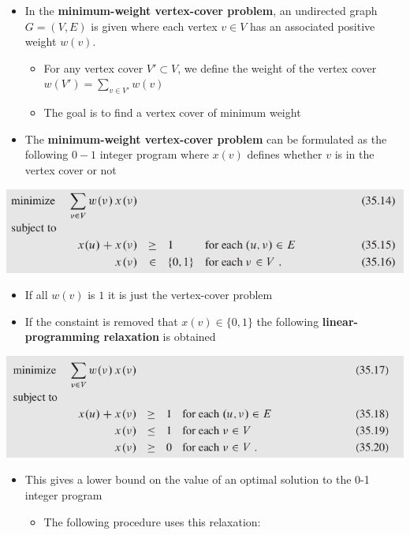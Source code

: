 \documentclass[11pt]{article}
\begin{document}
\begin{itemize}
\item In the \textbf{minimum-weight vertex-cover problem}, an undirected graph \(G=(V,E)\) is given where each vertex \(v \in V\) has an associated positive weight \(w(v)\).
\begin{itemize}
\item For any vertex cover \(V' \subset V\), we define the weight of the vertex cover \(w(V') = \sum_{v \in V'} w(v)\)
\item The goal is to find a vertex cover of minimum weight
\end{itemize}

\item The \textbf{minimum-weight vertex-cover problem} can be formulated as the following \(0-1\) integer program where \(x(v)\) defines whether \(v\) is in the vertex cover or not
\end{itemize}
\begin{center}
\includegraphics[width=.9\linewidth]{Approximation Algorithms/screenshot_2019-04-25_16-20-20.png}
\end{center}
\begin{itemize}
\item If all \(w(v)\) is \(1\) it is just the vertex-cover problem

\item If the constaint is removed that \(x(v) \in \{0,1\}\) the following \textbf{linear-programming relaxation} is obtained
\end{itemize}
\begin{center}
\includegraphics[width=.9\linewidth]{Approximation Algorithms/screenshot_2019-04-25_16-26-24.png}
\end{center}
\begin{itemize}
\item This gives a lower bound on the value of an optimal solution to the 0-1 integer program
\begin{itemize}
\item The following procedure uses this relaxation:
\end{itemize}
\end{itemize}
\end{document}
